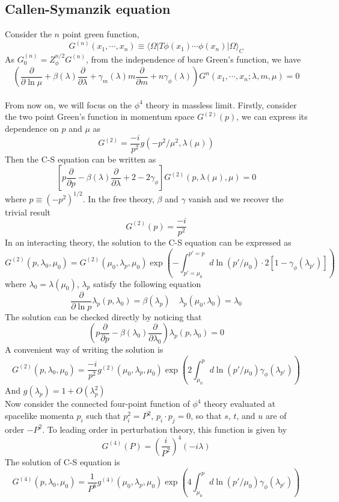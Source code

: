 \subsection{Callen-Symanzik equation}
Consider the $n$ point green function,
\[G^{(n)}(x_1,\cdots,x_n) \equiv \langle \Omega | T \phi(x_1) \cdots \phi(x_n) | \Omega \rangle_C \]
As $G^{(n)}_0 = Z_{\phi}^{n/2} G^{(n)}$, from the independence of bare Green's function, we have
\[\left( \frac{\partial}{\partial \ln \mu} + \beta(\lambda)  \frac{\partial}{\partial \lambda} + \gamma_m(\lambda) m  \frac{\partial}{\partial m} + n \gamma_{\phi}(\lambda)\right)G^{n}(x_1,\cdots,x_n;\lambda,m,\mu) = 0\]
\\
From now on, we will focus on the $\phi^4$ theory in massless limit. Firstly, consider the two point Green's function in momentum space $G^{(2)}(p)$, we can express its dependence on $p$ and $\mu$ as
\[G^{(2)} = \frac{-i}{p^2} g(-p^2/\mu^2,\lambda(\mu))\]
Then the C-S equation can be written as
\[\left[ p \frac{\partial}{\partial p} - \beta(\lambda)  \frac{\partial}{\partial \lambda} +2 - 2\gamma_{\phi}\right ] G^{(2)}(p,\lambda(\mu),\mu) = 0 \]
where $p \equiv (-p^2)^{1/2}$.
In the free theory, $\beta$ and $\gamma$ vanish and we recover the trivial result
\[G^{(2)}(p) = \frac{-i}{p^2}\]
In an interacting theory, the solution to the C-S equation can be expressed as
\[G^{(2)}(p,\lambda_0,\mu_0) = G^{(2)}(\mu_0,\lambda_p,\mu_0)\exp \left (-\int_{p'=\mu_0}^{p'=p} d \ln(p'/\mu_0) \cdot 2[1-\gamma_{\phi}(\lambda_{p'})] \right )\]
where $\lambda_0 = \lambda(\mu_0)$, $\lambda_p$ satisfy the following equation
\[\frac{\partial}{\partial \ln p} \lambda_p(p,\lambda_0) = \beta(\lambda_p) \quad \lambda_p(\mu_0,\lambda_0) = \lambda_0\]
The solution can be checked directly by noticing that
\[\left ( p \frac{\partial}{\partial p} - \beta(\lambda_0) \frac{\partial}{\partial \lambda_0} \right ) \lambda_p(p,\lambda_0) = 0\]
A convenient way of writing the solution is
\[G^{(2)}(p,\lambda_0,\mu_0) =  \frac{-i}{p^2} g^{(2)}(\mu_0,\lambda_p,\mu_0)\exp \left (2\int_{\mu_0}^{p} d \ln(p'/\mu_0)  \gamma_{\phi}(\lambda_{p'}) \right )\]
And $g(\lambda_p) = 1 + O(\lambda_p^2)$
\\
Now consider the connected four-point function of $\phi^4$ theory evaluated at spacelike momenta $p_i$ such that $p_i^2= P^2$, $p_i \cdot p_j = 0$, so that $s$, $t$, and $u$ are of order $-P^2$. To leading order in perturbation theory, this function is given by
\[G^{(4)}(P) = \left (\frac{i}{P^2}\right )^4 (-i\lambda)\]
The solution of C-S equation is
\[G^{(4)}(p,\lambda_0,\mu_0) =  \frac{1}{P^8} g^{(4)}(\mu_0,\lambda_p,\mu_0)\exp \left (4\int_{\mu_0}^{p} d \ln(p'/\mu_0)  \gamma_{\phi}(\lambda_{p'}) \right )\]

